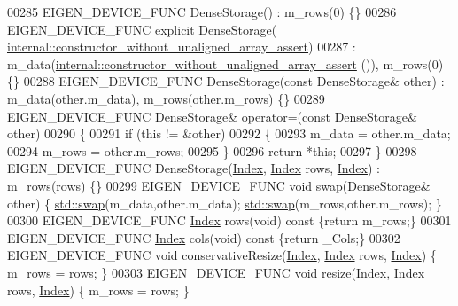 \begin{DoxyCode}
00285     EIGEN\_DEVICE\_FUNC DenseStorage() : m\_rows(0) \{\}
00286     EIGEN\_DEVICE\_FUNC \textcolor{keyword}{explicit} DenseStorage(
      \hyperlink{struct_eigen_1_1internal_1_1constructor__without__unaligned__array__assert}{internal::constructor\_without\_unaligned\_array\_assert})
00287       : m\_data(\hyperlink{struct_eigen_1_1internal_1_1constructor__without__unaligned__array__assert}{internal::constructor\_without\_unaligned\_array\_assert}
      ()), m\_rows(0) \{\}
00288     EIGEN\_DEVICE\_FUNC DenseStorage(\textcolor{keyword}{const} DenseStorage& other) : m\_data(other.m\_data), m\_rows(other.m\_rows) 
      \{\}
00289     EIGEN\_DEVICE\_FUNC DenseStorage& operator=(\textcolor{keyword}{const} DenseStorage& other) 
00290     \{
00291       \textcolor{keywordflow}{if} (\textcolor{keyword}{this} != &other)
00292       \{
00293         m\_data = other.m\_data;
00294         m\_rows = other.m\_rows;
00295       \}
00296       \textcolor{keywordflow}{return} *\textcolor{keyword}{this}; 
00297     \}
00298     EIGEN\_DEVICE\_FUNC DenseStorage(\hyperlink{namespace_eigen_a62e77e0933482dafde8fe197d9a2cfde}{Index}, \hyperlink{namespace_eigen_a62e77e0933482dafde8fe197d9a2cfde}{Index} rows, \hyperlink{namespace_eigen_a62e77e0933482dafde8fe197d9a2cfde}{Index}) : m\_rows(rows) \{\}
00299     EIGEN\_DEVICE\_FUNC \textcolor{keywordtype}{void} \hyperlink{endian_8c_a3ca5ecd34b04d6a243c054ac3a57f68d}{swap}(DenseStorage& other) \{ \hyperlink{endian_8c_a3ca5ecd34b04d6a243c054ac3a57f68d}{std::swap}(m\_data,other.m\_data); 
      \hyperlink{endian_8c_a3ca5ecd34b04d6a243c054ac3a57f68d}{std::swap}(m\_rows,other.m\_rows); \}
00300     EIGEN\_DEVICE\_FUNC \hyperlink{namespace_eigen_a62e77e0933482dafde8fe197d9a2cfde}{Index} rows(\textcolor{keywordtype}{void})\textcolor{keyword}{ const }\{\textcolor{keywordflow}{return} m\_rows;\}
00301     EIGEN\_DEVICE\_FUNC \hyperlink{namespace_eigen_a62e77e0933482dafde8fe197d9a2cfde}{Index} cols(\textcolor{keywordtype}{void})\textcolor{keyword}{ const }\{\textcolor{keywordflow}{return} \_Cols;\}
00302     EIGEN\_DEVICE\_FUNC \textcolor{keywordtype}{void} conservativeResize(\hyperlink{namespace_eigen_a62e77e0933482dafde8fe197d9a2cfde}{Index}, \hyperlink{namespace_eigen_a62e77e0933482dafde8fe197d9a2cfde}{Index} rows, \hyperlink{namespace_eigen_a62e77e0933482dafde8fe197d9a2cfde}{Index}) \{ m\_rows = rows; \}
00303     EIGEN\_DEVICE\_FUNC \textcolor{keywordtype}{void} resize(\hyperlink{namespace_eigen_a62e77e0933482dafde8fe197d9a2cfde}{Index}, \hyperlink{namespace_eigen_a62e77e0933482dafde8fe197d9a2cfde}{Index} rows, \hyperlink{namespace_eigen_a62e77e0933482dafde8fe197d9a2cfde}{Index}) \{ m\_rows = rows; \}

\end{DoxyCode}
